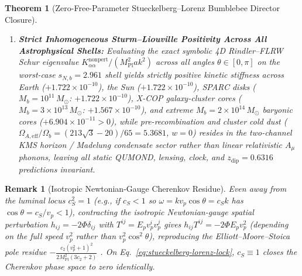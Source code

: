 \documentclass[11pt,a4paper]{article}
\newtheorem{theorem}{Theorem}[section]
\newtheorem*{remark}{Remark}
\begin{document}
\begin{theorem}[Zero-Free-Parameter Stueckelberg--Lorenz Bumblebee Director Closure]
\begin{enumerate}[label=(\roman*),leftmargin=1.9em,itemsep=2pt]
where the one-loop SM light-cone shift induced by graviton--director exchange (from the tree-level effective vertex $\Delta\mathcal{L}_{\mathrm{eff}}(T) = -\frac{c_{\mathrm{acc}}}{4 M_{\mathrm{Pl}}^2(2 - c_{\mathrm{acc}})}\allowbreak\frac{(T^{00} + T^i{}_i)^2}{k_\alpha k^\alpha}$) cuts off above the bumblebee radial Higgs threshold $m_r = \sqrt{\lambda_{\mathrm{dir}}}\,f_{\mathrm{dir}} \le f_{\mathrm{dir}}$ where $\mathrm{SO}^+(1,3)$ is restored.
\item \textbf{Strict Inhomogeneous Sturm--Liouville Positivity Across All Astrophysical Shells:} Evaluating the exact symbolic 4D Rindler--FLRW Schur eigenvalue $K_{\alpha\alpha}^{\mathrm{nonpert}}/(M_{\mathrm{Pl}}^2 a k^2)$ across all angles $\theta \in [0,\pi]$ on the worst-case $s_{N,b} = 2.961$ shell yields strictly positive kinetic stiffness across Earth ($+1.722\times 10^{-10}$), the Sun ($+1.722\times 10^{-10}$), SPARC disks ($M_b = 10^{11}\,M_\odot$: $+1.722\times 10^{-10}$), X-COP galaxy-cluster cores ($M_b = 3\times 10^{13}\,M_\odot$: $+1.567\times 10^{-10}$), and extreme $M_b = 2\times 10^{14}\,M_\odot$ baryonic cores ($+6.904\times 10^{-11} > 0$), while pre-recombination and cluster cold dust ($\Omega_{A,\mathrm{eff}}/\Omega_b = (213\sqrt{3}-20)/65 = 5.3681$, $w = 0$) resides in the two-channel KMS horizon / Madelung condensate sector rather than linear relativistic $A_\mu$ phonons, leaving all static QUMOND, lensing, clock, and $z_{\mathrm{dip}} = 0.6316$ predictions invariant.
\end{enumerate}
\end{theorem}

\begin{remark}[Isotropic Newtonian-Gauge Cherenkov Residue]
Even away from the luminal locus $c_S^2 = 1$ (e.g., if $c_S < 1$ so $\omega = k v_p\cos\theta = c_S k$ has $\cos\theta = c_S/v_p < 1$), contracting the isotropic Newtonian-gauge spatial perturbation $h_{ij} = -2\Phi\delta_{ij}$ with $T^{ij} = E_p v_p^i v_p^j$ gives $h_{ij}T^{ij} = -2\Phi E_p v_p^2$ (depending on the full speed $v_p^2$ rather than $v_p^2\cos^2\theta$), reproducing the Elliott--Moore--Stoica pole residue $-\frac{c_2(v_p^2 + 1)^2}{2 M_{\mathrm{Pl}}^2(3 c_2 + 2)}$ \cite{ElliottMooreStoica2005}. On Eq.~\eqref{eq:stueckelberg-lorenz-lock}, $c_S \equiv 1$ closes the Cherenkov phase space to zero identically.
\end{remark}
\end{document}
